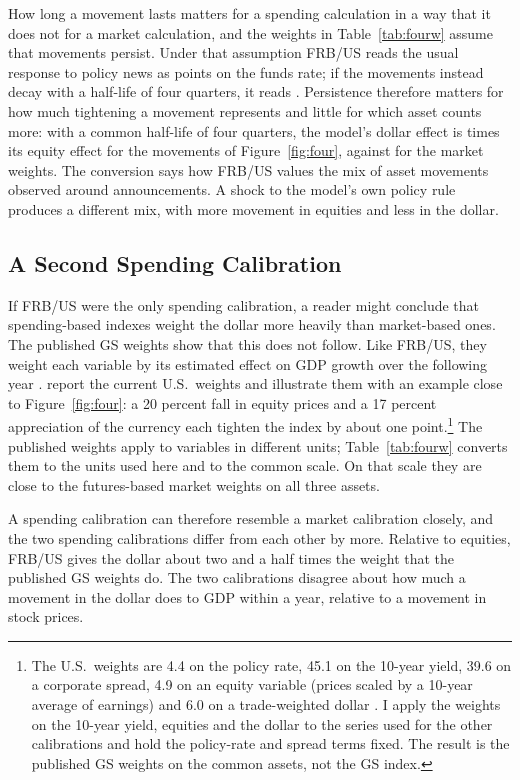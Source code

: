 How long a movement lasts matters for a spending calculation in a way that it does not for a market calculation, and the weights in Table~\ref{tab:fourw} assume that movements persist. Under that assumption FRB/US reads the usual response to policy news as  points on the funds rate; if the movements instead decay with a half-life of four quarters, it reads . Persistence therefore matters for how much tightening a movement represents and little for which asset counts more: with a common half-life of four quarters, the model's dollar effect is  times its equity effect for the movements of Figure~\ref{fig:four}, against  for the market weights. The conversion says how FRB/US values the mix of asset movements observed around announcements. A shock to the model's own policy rule produces a different mix, with more movement in equities and less in the dollar.

\subsection{A Second Spending Calibration}\label{sec:gs}
If FRB/US were the only spending calibration, a reader might conclude that spending-based indexes weight the dollar more heavily than market-based ones. The published GS weights show that this does not follow. Like FRB/US, they weight each variable by its estimated effect on GDP growth over the following year \citep{dudley2000,hatzius2018}. \citet{caballero2026b} report the current U.S.\ weights and illustrate them with an example close to Figure~\ref{fig:four}: a 20 percent fall in equity prices and a 17 percent appreciation of the currency each tighten the index by about one point.\footnote{The U.S.\ weights are 4.4 on the policy rate, 45.1 on the 10-year yield, 39.6 on a corporate spread, 4.9 on an equity variable (prices scaled by a 10-year average of earnings) and 6.0 on a trade-weighted dollar \citep{caballero2026b}. I apply the weights on the 10-year yield, equities and the dollar to the series used for the other calibrations and hold the policy-rate and spread terms fixed. The result is the published GS weights on the common assets, not the GS index.} The published weights apply to variables in different units; Table~\ref{tab:fourw} converts them to the units used here and to the common scale. On that scale they are close to the futures-based market weights on all three assets.

A spending calibration can therefore resemble a market calibration closely, and the two spending calibrations differ from each other by more. Relative to equities, FRB/US gives the dollar about two and a half times the weight that the published GS weights do. The two calibrations disagree about how much a movement in the dollar does to GDP within a year, relative to a movement in stock prices.

